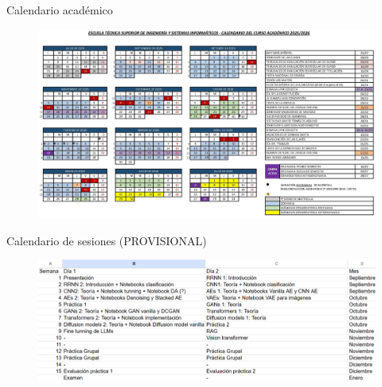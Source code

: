 \begin{frame}{Calendario académico}
\begin{figure}
    \centering
    \includegraphics[width=\textwidth]{Slides/figures/Presentacion/Calendario_Academico.png}
\end{figure}
\end{frame}

\begin{frame}{Calendario de sesiones (PROVISIONAL)}
\begin{figure}
    \centering
    \includegraphics[width=\textwidth]{Slides/figures/Presentacion/Sesiones.png}
\end{figure}
\end{frame}


